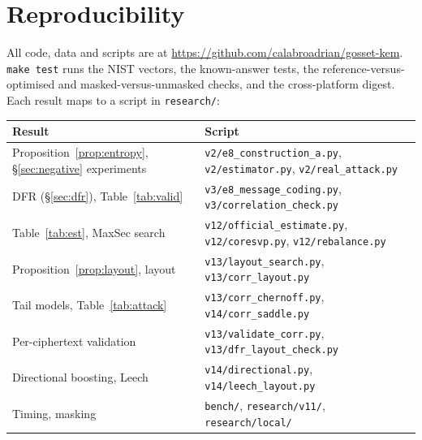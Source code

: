 \documentclass[11pt,a4paper]{article}
\theoremstyle{definition}
\theoremstyle{remark}
\begin{document}
\section{Reproducibility}\label{app:repro}
All code, data and scripts are at \url{https://github.com/calabroadrian/gosset-kem}. \texttt{make test} runs the NIST vectors, the known-answer tests, the reference-versus-optimised and masked-versus-unmasked checks, and the cross-platform digest. Each result maps to a script in \texttt{research/}:
\begin{center}\small
\begin{tabular}{ll}\toprule
Result & Script\\\midrule
Proposition~\ref{prop:entropy}, \S\ref{sec:negative} experiments & \texttt{v2/e8\_construction\_a.py}, \texttt{v2/estimator.py}, \texttt{v2/real\_attack.py}\\
DFR (\S\ref{sec:dfr}), Table~\ref{tab:valid} & \texttt{v3/e8\_message\_coding.py}, \texttt{v3/correlation\_check.py}\\
Table~\ref{tab:est}, MaxSec search & \texttt{v12/official\_estimate.py}, \texttt{v12/coresvp.py}, \texttt{v12/rebalance.py}\\
Proposition~\ref{prop:layout}, layout & \texttt{v13/layout\_search.py}, \texttt{v13/corr\_layout.py}\\
Tail models, Table~\ref{tab:attack} & \texttt{v13/corr\_chernoff.py}, \texttt{v14/corr\_saddle.py}\\
Per-ciphertext validation & \texttt{v13/validate\_corr.py}, \texttt{v13/dfr\_layout\_check.py}\\
Directional boosting, Leech & \texttt{v14/directional.py}, \texttt{v14/leech\_layout.py}\\
Timing, masking & \texttt{bench/}, \texttt{research/v11/}, \texttt{research/local/}\\\bottomrule
\end{tabular}
\end{center}
\end{document}
